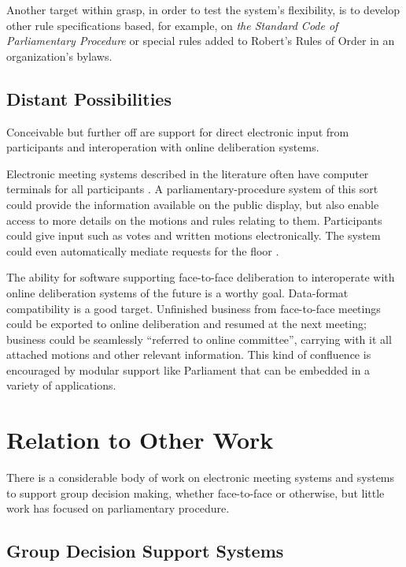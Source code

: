 \documentclass{acm_proc_article-sp}
\begin{document}
Another target within grasp, in order to test the system's flexibility, is to develop other rule specifications based, for example, on \textit{the Standard Code of Parliamentary Procedure} \cite{sturgis:standard} or special rules added to Robert's Rules of Order in an organization's bylaws.

\subsection{Distant Possibilities}

Conceivable but further off are support for direct electronic input from participants and interoperation with online deliberation systems.

Electronic meeting systems described in the literature often have computer terminals for all participants \cite{nunamaker:electronic}. A parliamentary-procedure system of this sort could provide the information available on the public display, but also enable access to more details on the motions and rules relating to them. Participants could give input such as votes and written motions electronically. The system could even automatically mediate requests for the floor \cite{stodolsky:automatic}.

The ability for software supporting face-to-face deliberation to interoperate with online deliberation systems of the future is a worthy goal. Data-format compatibility is a good target. Unfinished business from face-to-face meetings could be exported to online deliberation and resumed at the next meeting; business could be seamlessly ``referred to online committee'', carrying with it all attached motions and other relevant information. This kind of confluence is encouraged by modular support like Parliament \cite{shanks:parliament} that can be embedded in a variety of applications.

\section{Relation to Other Work}  %

There is a considerable body of work on electronic meeting systems and systems to support group decision making, whether face-to-face or otherwise, but little work has focused on parliamentary procedure.

\subsection{Group Decision Support Systems}
\end{document}
